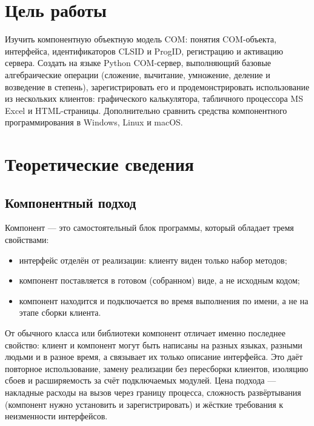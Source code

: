 \documentclass[14pt,a4paper]{extarticle}
\begin{document}

\tableofcontents

\section{Цель работы}

Изучить компонентную объектную модель COM: понятия COM-объекта, интерфейса,
идентификаторов CLSID и ProgID, регистрацию и активацию сервера. Создать на языке
Python COM-сервер, выполняющий базовые алгебраические операции (сложение, вычитание,
умножение, деление и возведение в степень), зарегистрировать его и продемонстрировать
использование из нескольких клиентов: графического калькулятора, табличного процессора
MS Excel и HTML-страницы. Дополнительно сравнить средства компонентного программирования
в Windows, Linux и macOS.

\section{Теоретические сведения}

\subsection{Компонентный подход}

Компонент --- это самостоятельный блок программы, который обладает тремя свойствами:
\begin{itemize}
\item интерфейс отделён от реализации: клиенту виден только набор методов;
\item компонент поставляется в готовом (собранном) виде, а не исходным кодом;
\item компонент находится и подключается во время выполнения по имени, а не на этапе
сборки клиента.
\end{itemize}

От обычного класса или библиотеки компонент отличает именно последнее свойство: клиент и
компонент могут быть написаны на разных языках, разными людьми и в разное время, а
связывает их только описание интерфейса. Это даёт повторное использование, замену
реализации без пересборки клиентов, изоляцию сбоев и расширяемость за счёт подключаемых
модулей. Цена подхода --- накладные расходы на вызов через границу процесса, сложность
развёртывания (компонент нужно установить и зарегистрировать) и жёсткие требования к
неизменности интерфейсов.
\end{document}

